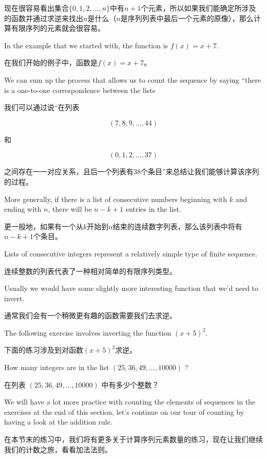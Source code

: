 现在很容易看出集合$\{0, 1, 2, \ldots , n \}$中有$n+1$个元素，所以如果我们能确定所涉及的函数并通过求逆来找出$n$是什么（$n$是序列列表中最后一个元素的原像），那么计算有限序列的元素就会很容易。

In the example that we started with, the function is $f(x)=x+7$.

在我们开始的例子中，函数是$f(x)=x+7$。

We
can sum up the process that allows us to count the sequence by saying
``there is a one-to-one correspondence between the lists %

我们可以通过说“在列表

\[ (7, 8, 9, \ldots , 44 ) \]

\noindent 和

\[ (0, 1, 2, \ldots , 37 ) \]

\noindent 之间存在一一对应关系，且后一个列表有38个条目”来总结让我们能够计算该序列的过程。

More generally, if there is a list of consecutive numbers beginning
with $k$ and ending with $n$, there will be $n-k+1$ entries in the 
list.

更一般地，如果有一个从$k$开始到$n$结束的连续数字列表，那么该列表中将有$n-k+1$个条目。

Lists of consecutive integers represent a relatively simple
type of finite sequence.

连续整数的列表代表了一种相对简单的有限序列类型。

Usually we would have some slightly more
interesting function that we'd need to invert.

通常我们会有一个稍微更有趣的函数需要我们去求逆。

The following exercise involves inverting the function $(x+5)^2$.

下面的练习涉及到对函数$(x+5)^2$求逆。

\begin{exer}
How many integers are in the list $(25, 36, 49, \ldots , 10000)$ ?
\end{exer}

\begin{exer}
在列表 $(25, 36, 49, \ldots , 10000)$ 中有多少个整数？
\end{exer}

We will have a lot more practice with counting the elements of sequences
in the exercises at the end of this section, let's continue on our
tour of counting by having a look at the addition rule.

在本节末的练习中，我们将有更多关于计算序列元素数量的练习，现在让我们继续我们的计数之旅，看看加法法则。

